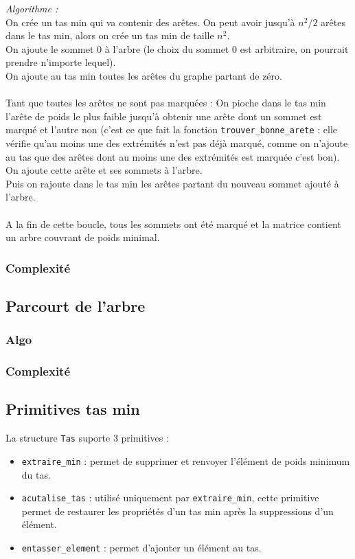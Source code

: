 \documentclass[a4paper,11pt]{article}
\begin{document}
\textit{Algorithme : } \\
On crée un tas min qui va contenir des arêtes. On peut avoir jusqu'à $n^2/2$ arêtes dans le tas min, alors on crée un tas min de taille $n^2$.\\
On ajoute le sommet 0 à l'arbre (le choix du sommet 0 est arbitraire, on pourrait prendre n'importe lequel).\\
On ajoute au tas min toutes les arêtes du graphe partant de zéro.\\
\\
Tant que toutes les arêtes ne sont pas marquées : 
On pioche dans le tas min l'arête de poids le plus faible jusqu'à obtenir une arête dont un sommet est marqué et l'autre non (c'est ce que fait la fonction \texttt{trouver\_bonne\_arete} : elle vérifie qu'au moins une des extrémités n'est pas déjà marqué, comme on n'ajoute au tas que des arêtes dont au moins une des extrémités est marquée c'est bon).\\
On ajoute cette arête et ses sommets à l'arbre.\\
Puis on rajoute dans le tas min les arêtes partant du nouveau sommet ajouté à l'arbre.\\
\\
A la fin de cette boucle, tous les sommets ont été marqué et la matrice contient un arbre couvrant de poids minimal.\\

\subsubsection*{Complexité}

\subsection{Parcourt de l'arbre} %
\subsubsection*{Algo}
\subsubsection*{Complexité}

\subsection{Primitives tas min} %
La structure \texttt{Tas} suporte 3 primitives :
\begin{itemize}
\item \texttt{extraire_min} : permet de supprimer et renvoyer l’élément de poids minimum du tas.
\item \texttt{acutalise_tas} : utilisé uniquement par \texttt{extraire_min}, cette primitive permet de restaurer les propriétés d'un tas min après la suppressions d'un élément.
\item \texttt{entasser_element} : permet d'ajouter un élément au tas.
\end{itemize}
\end{document}
